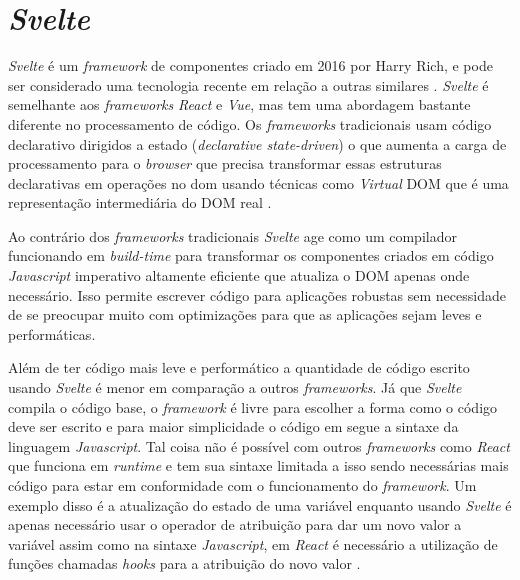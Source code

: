 \section{\textit{Svelte}}
\textit{Svelte} é um \textit{framework} de componentes criado em 2016 por Harry Rich, e pode ser considerado uma tecnologia recente em relação a outras similares \cite{krill_slim_2016}. \textit{Svelte} é semelhante aos \textit{frameworks} \textit{React} e \textit{Vue}, mas tem uma abordagem bastante diferente no processamento de código. Os \textit{frameworks} tradicionais usam código declarativo dirigidos a estado (\textit{declarative state-driven}) o que aumenta a carga de processamento para o \textit{browser} que precisa transformar essas estruturas declarativas em operações no \gls{dom} usando técnicas como \textit{Virtual} DOM que é uma representação intermediária do DOM real \cite{harris_svelte_2019}.

Ao contrário dos \textit{frameworks} tradicionais \textit{Svelte} age como um compilador funcionando em \textit{build-time} para transformar os componentes criados em código \textit{Javascript} imperativo altamente eficiente que atualiza o DOM apenas onde necessário. Isso permite escrever código para aplicações robustas sem necessidade de se preocupar muito com optimizações para que as aplicações sejam leves e performáticas.

Além de ter código mais leve e performático a quantidade de código escrito usando \textit{Svelte} é menor em comparação a outros \textit{frameworks}. Já que \textit{Svelte} compila o código base, o \textit{framework} é livre para escolher a forma como o código deve ser escrito e para maior simplicidade o código em  segue a sintaxe da linguagem \textit{Javascript}. Tal coisa não é possível com outros \textit{frameworks} como \textit{React} que funciona em \textit{runtime} e tem sua sintaxe limitada a isso sendo necessárias mais código para estar em conformidade com o funcionamento do \textit{framework}. Um exemplo disso é a atualização do estado de uma variável enquanto usando \textit{Svelte} é apenas necessário usar o operador de atribuição para dar um novo valor a variável assim como na sintaxe \textit{Javascript}, em \textit{React} é necessário a utilização de funções chamadas \textit{hooks} para a atribuição do novo valor \cite{harris_write_2019}.
